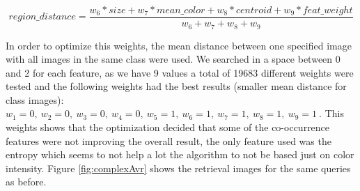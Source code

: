 \documentclass[12pt,a4paper]{article}
\begin{document}
\begin{equation}
region\_distance =  \frac{w_6 * size + w_7 * mean\_color + w_8 * centroid +  w_9 * feat\_weight}{w_6 + w_7 + w_8 + w_9}
\label{eq:complex_feat}
\end{equation}


In order to optimize this weights, the mean distance between one specified image with all images in the same class were used. We searched in a space between 0 and 2 for each feature, as we have 9 values a total of 19683 different weights were tested and the following weights had the best results (smaller mean distance for class images): $w_1 = 0, \ w_2 = 0, \ w_3 = 0, \ w_4 = 0, \ w_5 = 1, \ w_6 = 1, \ w_7 = 1, \ w_8 = 1, \ w_9 = 1 \ $. This weights shows that the optimization decided that some of the co-occurrence features were not improving the overall result, the only feature used was the entropy which seems to not help a lot the algorithm to not be based just on color intensity. Figure \ref{fig:complexAvr} shows the retrieval images for the same queries as before. \\
\end{document}
